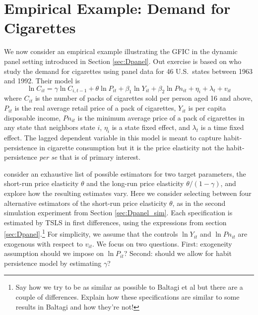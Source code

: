 \section{Empirical Example: Demand for Cigarettes}
\label{sec:cigarettes}
We now consider an empirical example illustrating the GFIC in the dynamic panel setting introduced in Section \ref{sec:Dpanel}.
Out exercise is based on \cite{BaltagiEtAl2000} who study the demand for cigarettes using panel data for 46 U.S.\ states between 1963 and 1992. 
Their model is
\[
  \ln C_{it} =  \gamma \ln C_{i,t-1} + \theta \ln P_{it} + \beta_1 \ln Y_{it} + \beta_2 \ln Pn_{it} + \eta_i + \lambda_t + v_{it}
\] 
where $C_{it}$ is the number of packs of cigarettes sold per person aged 16 and above, $P_{it}$ is the real average retail price of a pack of cigarettes, $Y_{it}$ is per capita disposable income, $Pn_{it}$ is the minimum average price of a pack of cigarettes in any state that neighbors state $i$, $\eta_i$ is a state fixed effect, and $\lambda_t$ is a time fixed effect.
The lagged dependent variable in this model is meant to capture habit-persistence in cigarette consumption but it is the price elasticity not the habit-persistence \emph{per se} that is of primary interest. 

\cite{BaltagiEtAl2000} consider an exhaustive list of possible estimators for two target parameters, the short-run price elasticity $\theta$ and the long-run price elasticity $\theta/(1 - \gamma)$, and explore how the resulting estimates vary.
Here we consider selecting between four alternative estimators of the short-run price elasticity $\theta$, as in the second simulation experiment from Section \ref{sec:Dpanel_sim}.
Each specification is estimated by TSLS in first differences, using the expressions from section \ref{sec:Dpanel}.\footnote{Say how we try to be as similar as possible to Baltagi et al but there are a couple of differences. Explain how these specifications are similar to some results in Baltagi and how they're not!}
For simplicity, we assume that the controls $\ln Y_{it}$ and $\ln Pn_{it}$ are exogenous with respect to $v_{it}$.
We focus on two questions.
First: exogeneity assumption should we impose on $\ln P_{it}$?
Second: should we allow for habit persistence model by estimating $\gamma$?

